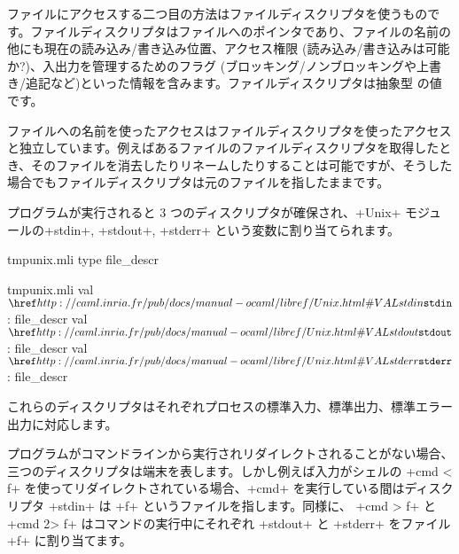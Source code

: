 ファイルにアクセスする二つ目の方法はファイルディスクリプタを使うものです。ファイルディスクリプタはファイルへのポインタであり、ファイルの名前の他にも現在の読み込み/書き込み位置、アクセス権限 (読み込み/書き込みは可能か?)、入出力を管理するためのフラグ (ブロッキング/ノンブロッキングや上書き/追記など)といった情報を含みます。ファイルディスクリプタは抽象型  の値です。

ファイルへの名前を使ったアクセスはファイルディスクリプタを使ったアクセスと独立しています。例えばあるファイルのファイルディスクリプタを取得したとき、そのファイルを消去したりリネームしたりすることは可能ですが、そうした場合でもファイルディスクリプタは元のファイルを指したままです。

プログラムが実行されると 3 つのディスクリプタが確保され、\ml+Unix+ モジュールの\ml+stdin+, \ml+stdout+, \ml+stderr+ という変数に割り当てられます。
\begin{codefile}{tmpunix.mli}
type file_descr
\end{codefile}
\begin{listingcodefile}{tmpunix.mli}
val $\indexlibvalue{Unix}{stdin}$ : file_descr
val $\indexlibvalue{Unix}{stdout}$ : file_descr
val $\indexlibvalue{Unix}{stderr}$ : file_descr
\end{listingcodefile}
これらのディスクリプタはそれぞれプロセスの標準入力、標準出力、標準エラー出力に対応します。

プログラムがコマンドラインから実行されリダイレクトされることがない場合、三つのディスクリプタは端末を表します。しかし例えば入力がシェルの \ml+cmd < f+ を使ってリダイレクトされている場合、\ml+cmd+ を実行している間はディスクリプタ \ml+stdin+ は \ml+f+ というファイルを指します。同様に、 \ml+cmd > f+ と \ml+cmd 2> f+ はコマンドの実行中にそれぞれ \ml+stdout+ と \ml+stderr+ をファイル \ml+f+ に割り当てます。


